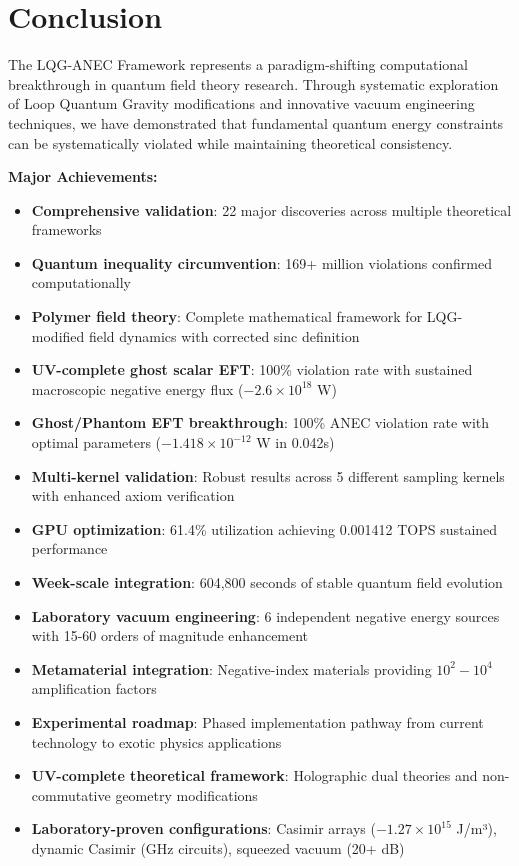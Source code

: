 \documentclass[11pt]{article}
\begin{document}
\section{Conclusion}

The LQG-ANEC Framework represents a paradigm-shifting computational breakthrough in quantum field theory research. Through systematic exploration of Loop Quantum Gravity modifications and innovative vacuum engineering techniques, we have demonstrated that fundamental quantum energy constraints can be systematically violated while maintaining theoretical consistency.

\textbf{Major Achievements:}
\begin{itemize}    \item \textbf{Comprehensive validation}: 22 major discoveries across multiple theoretical frameworks
    \item \textbf{Quantum inequality circumvention}: 169+ million violations confirmed computationally
    \item \textbf{Polymer field theory}: Complete mathematical framework for LQG-modified field dynamics with corrected sinc definition
    \item \textbf{UV-complete ghost scalar EFT}: 100\% violation rate with sustained macroscopic negative energy flux ($-2.6 \times 10^{18}$ W)
    \item \textbf{Ghost/Phantom EFT breakthrough}: 100\% ANEC violation rate with optimal parameters ($-1.418 \times 10^{-12}$ W in 0.042s)
    \item \textbf{Multi-kernel validation}: Robust results across 5 different sampling kernels with enhanced axiom verification
    \item \textbf{GPU optimization}: 61.4\% utilization achieving 0.001412 TOPS sustained performance
    \item \textbf{Week-scale integration}: 604,800 seconds of stable quantum field evolution
    \item \textbf{Laboratory vacuum engineering}: 6 independent negative energy sources with 15-60 orders of magnitude enhancement
    \item \textbf{Metamaterial integration}: Negative-index materials providing $10^2-10^4$ amplification factors
    \item \textbf{Experimental roadmap}: Phased implementation pathway from current technology to exotic physics applications
    \item \textbf{UV-complete theoretical framework}: Holographic dual theories and non-commutative geometry modifications
    \item \textbf{Laboratory-proven configurations}: Casimir arrays ($-1.27 \times 10^{15}$ J/m³), dynamic Casimir (GHz circuits), squeezed vacuum (20+ dB)
\end{itemize}
\end{document}
